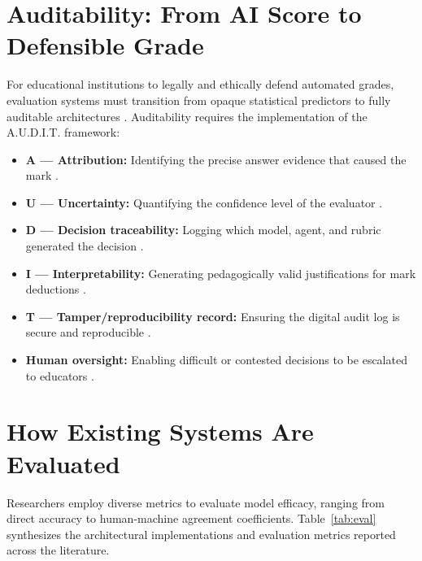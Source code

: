 \documentclass[11pt,a4paper]{article}
\begin{document}
\section{Auditability: From AI Score to Defensible Grade}
For educational institutions to legally and ethically defend automated grades, evaluation systems must transition from opaque statistical predictors to fully auditable architectures \cite{P014, P015, P024}. Auditability requires the implementation of the A.U.D.I.T. framework:
\begin{itemize}
    \item \textbf{A — Attribution:} Identifying the precise answer evidence that caused the mark \cite{P014}.
    \item \textbf{U — Uncertainty:} Quantifying the confidence level of the evaluator \cite{P022, P028}.
    \item \textbf{D — Decision traceability:} Logging which model, agent, and rubric generated the decision \cite{P011, P015}.
    \item \textbf{I — Interpretability:} Generating pedagogically valid justifications for mark deductions \cite{P012, P025}.
    \item \textbf{T — Tamper/reproducibility record:} Ensuring the digital audit log is secure and reproducible \cite{P012, P027}.
    \item \textbf{Human oversight:} Enabling difficult or contested decisions to be escalated to educators \cite{P008, P011}.
\end{itemize}

\section{How Existing Systems Are Evaluated}

Researchers employ diverse metrics to evaluate model efficacy, ranging from direct accuracy to human-machine agreement coefficients. Table~\ref{tab:eval} synthesizes the architectural implementations and evaluation metrics reported across the literature.
\end{document}
